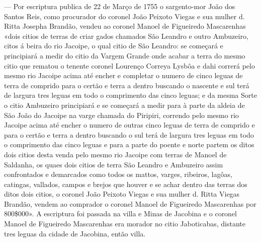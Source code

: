 — Por escriptura publica de 22 de Março de 1755 o sargento-mor João dos Santos Reis, como procurador do coronel João Peixoto Viegas e sua mulher d. Ritta Josepha Brandão, vendeu ao coronel Manoel de Figueiredo Mascarenhas «dois citios de terras de criar gados chamados São Leandro e outro Ambuzeiro, citos á beira do rio Jacoipe, o qual citio de São Leandro: se começará e principiará a medir do citio da Vargem Grande onde acabar a terra do mesmo citio que rematou o tenente coronel Lourenço Correya Lysbôa e dahi correrá pelo mesmo rio Jacoipe acima até encher e completar o numero de cinco leguas de terra de comprido para o certão e terra a dentro buscando o nascente e sul terá de largura tres leguas em todo o comprimento das cinco leguas; e da mesma Sorte o citio Ambuzeiro principiará e se começará a medir para à parte da aldeia de São João do Jacoipe na varge chamada do Piripiri, correndo pelo mesmo rio Jacoipe acima até encher o numero de outras cinco leguas de terra de comprido e para o certão e terra  a dentro buscando o sul terá de largura tres leguas em todo o comprimento das cinco leguas e para a parte do poente e norte partem os ditos dois citios desta venda pelo mesmo rio Jacoipe com  terras de Manoel de Saldanha, os quaes dois citios de terra São Leandro e Ambuzeiro assim confrontados e demarcados como todos os mattos, varges, ribeiros, lagôas, catingas, vallados, campos e brejos que houver e se achar dentro das terras dos ditos dois citios, o coronel João Peixoto Viegas e sua mulher d. Ritta Viegas Brandão, vendem ao comprador o coronel Manoel de Figueiredo Mascarenhas por 800\$000». A escriptura foi passada na villa e Minas de Jacobina e o coronel Manoel de Figueiredo Mascarenhas era morador no citio Jaboticabas, distante tres leguas da cidade de Jacobina, então villa.





